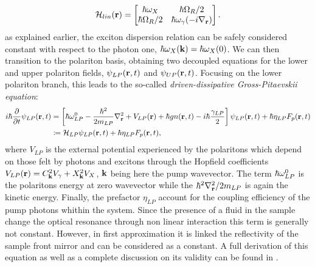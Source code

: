 \begin{equation}
    \mathcal{H}_{lin}(\mathbf{r})
    = 
    \begin{bmatrix}
    \hbar \omega_X & \hbar \Omega_R / 2 \\
    \hbar \Omega_R / 2 & \hbar \omega_\gamma(-i \nabla_{\mathbf{r}})  
    \end{bmatrix}.
\end{equation}
as explained earlier, the exciton dispersion relation can be safely considered constant with respect to the photon one, $\hbar \omega_X(\mathbf{k})=\hbar \omega_X(0)$.
We can then transition to the polariton basis, obtaining two decoupled equations for the lower and upper polariton fields, $\psi_{LP}(\mathbf{r},t)$ and $\psi_{UP}(\mathbf{r},t)$. Focusing on the lower polariton branch, this leads to the so-called \textit{driven-dissipative Gross-Pitaevskii equation}:
\begin{equation}
    \begin{align}
    i \hbar \dfrac{\partial}{\partial t} \psi_{LP}(\mathbf{r}, t) &= \left[ \hbar \omega_{LP}^0 -\dfrac{\hbar^2}{2 m_{LP}}\nabla_{\mathbf{r}}^2 + V_{LP}(\mathbf{r}) + \hbar g n(\mathbf{r}, t) - i \hbar \dfrac{\gamma_{LP}}{2} \right] \psi_{LP}(\mathbf{r}, t) + \hbar \eta_{LP} F_p(\mathbf{r}, t) \\
        &\coloneq \mathcal{H}_{LP} \psi_{LP}(\mathbf{r}, t) + \hbar \eta_{LP} F_p(\mathbf{r}, t),
    \end{align}
    \label{eq:generalized_GPE}
\end{equation}
where $V_{LP}$ is the external potential experienced by the polaritons which depend on those felt by photons and excitons through the Hopfield 
coefficients $V_{LP}(\mathbf{r}) = C^2_{\mathbf{k}} V_{\gamma} + X^2_{\mathbf{k}} V_{X}$, $\mathbf{k}$ being here the pump wavevector. The term $\hbar \omega_{LP}^0$ is the polaritons energy at zero wavevector while the $\hbar^2\nabla^2_{\mathbf{r}} /2m_{LP}$ is again the kinetic energy. Finally, the prefactor $\eta_{LP}$ account for the coupling efficiency of the pump photons whithin the system.
Since the presence of a fluid in the sample change the optical resonance through non linear interaction this term is generally not constant. However, in first approximation it is linked the reflectivity of the sample front mirror and can be considered as a constant. A full derivation of this equation as well as a complete discussion on its validity can be found in \cite{carusotto_quantum_2013}.

\bigskip


